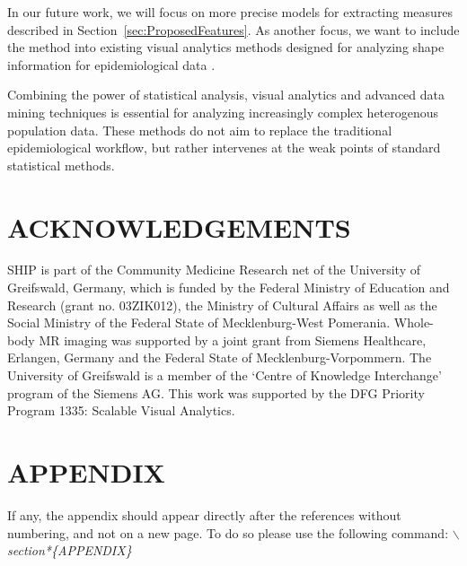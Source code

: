 \documentclass[a4paper,twoside]{style/article}
\begin{document}
In our future work, we will focus on more precise models for extracting measures described in Section~\ref{sec:ProposedFeatures}.
As another focus, we want to include the method into existing visual analytics methods designed for analyzing shape information for epidemiological data \cite{Klemm2014VIS}.

Combining the power of statistical analysis, visual analytics and advanced data mining techniques is essential for analyzing increasingly complex heterogenous population data.
These methods do not aim to replace the traditional epidemiological workflow, but rather intervenes at the weak points of standard statistical methods.

\section*{\uppercase{Acknowledgements}}

\noindent SHIP is part of the Community Medicine Research net of the University of Greifswald, Germany, which is funded by the Federal Ministry of Education and Research (grant no. 03ZIK012), the Ministry of Cultural Affairs as well as the Social Ministry of the Federal State of Mecklenburg-West Pomerania. Whole-body MR imaging was supported by a joint grant from Siemens Healthcare, Erlangen, Germany and the Federal State of Mecklenburg-Vorpommern. The University of Greifswald is a member of the ‘Centre of Knowledge Interchange’ program of the Siemens AG. This work was supported by the DFG Priority Program 1335: Scalable Visual Analytics.


\vfill

{\small
}


\section*{\uppercase{Appendix}}

\noindent If any, the appendix should appear directly after the
references without numbering, and not on a new page. To do so please use the following command:
\textit{$\backslash$section*\{APPENDIX\}}

\vfill
\end{document}
